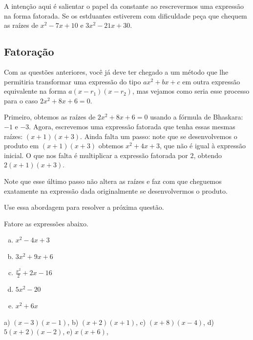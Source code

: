 \documentclass[main.tex]{subfiles}
\begin{document}
\paraTutores

A intenção aqui é salientar o papel da constante ao rescrevermos uma expressão na forma fatorada. Se os estduantes estiverem com dificuldade peça que chequem as raízes de $x^2-7x+10$ e $3x^2-21x+30$.

\paraAmbos

\subsection*{Fatoração}

Com as questões anteriores, você já deve ter chegado a um método que lhe permitiria transformar uma expressão do tipo $ax^2+bx+c$ em outra expressão equivalente na forma $a(x-r_1)(x-r_2)$, mas vejamos como seria esse processo para o caso $2x^2+8x+6=0$.

Primeiro, obtemos as raízes de $2x^2+8x+6=0$ usando a fórmula de Bhaskara: $-1$ e $-3$. Agora, escrevemos uma expressão fatorada que tenha essas mesmas raízes: $(x+1)(x+3)$. Ainda falta um passo: note que se desenvolvemos o produto em $(x+1)(x+3)$ obtemos $x^2+4x+3$, que não é igual à expressão inicial. O que nos falta é multiplicar a expressão fatorada por $2$, obtendo $2(x+1)(x+3)$.

Note que esse último passo não altera as raízes e faz com que cheguemos exatamente na expressão dada originalmente se desenvolvermos o produto.

Use essa abordagem para resolver a próxima questão.

\begin{questao}
Fatore as expressões abaixo.
\begin{enumerate}[a)]
\item $x^2-4x+3$
\item $3x^2+9x+6$
\item $\frac{x^2}{2}+2x-16$
\item $5x^2-20$
\item $x^2+6x$
\end{enumerate}
\end{questao}

\begin{gabarito}
	\begin{gabaritoQuestao}
		a) $(x-3)(x-1)$, b) $(x+2)(x+1)$, c) $(x+8)(x-4)$, d) $5(x+2)(x-2)$, e) $x(x+6)$,
	\end{gabaritoQuestao}
\end{gabarito}
\end{document}
